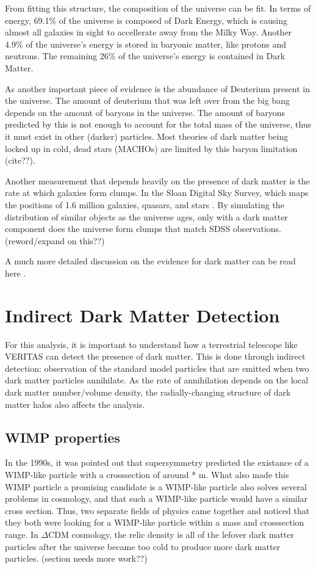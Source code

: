     From fitting this structure, the composition of the universe can be fit.
    In terms of energy, 69.1\% of the universe is composed of Dark Energy, which is causing almost all galaxies in sight to accellerate away from the Milky Way.
    Another 4.9\% of the universe's energy is stored in baryonic matter, like protons and neutrons.
    The remaining 26\% of the universe's energy is contained in Dark Matter\cite{planck2015}.

    As another important piece of evidence is the abundance of Deuterium present in the universe.
    The amount of deuterium that was left over from the big bang depends on the amount of baryons in the universe.
    The amount of baryons predicted by this is not enough to account for the total mass of the universe, thus it must exist in other (darker) particles.
    Most theories of dark matter being locked up in cold, dead stars (MACHOs) are limited by this baryon limitation (cite??).

    Another measurement that depends heavily on the presence of dark matter is the rate at which galaxies form clumps.
    In the Sloan Digital Sky Survey, which maps the positions of 1.6 million galaxies, quasars, and stars \cite{sdss_release}.
    By simulating the distribution of similar objects as the universe ages, only with a dark matter component does the universe form clumps that match SDSS observations.
    (reword/expand on this??)
  
    A much more detailed discussion on the evidence for dark matter can be read here \cite{DMPrimer}.

\section{Indirect Dark Matter Detection}
  For this analysis, it is important to understand how a terrestrial telescope like VERITAS can detect the presence of dark matter.
  This is done through indirect detection: observation of the standard model particles that are emitted when two dark matter particles annihilate.
  As the rate of annihilation depends on the local dark matter number/volume density, the radially-changing structure of dark matter halos also affects the analysis.
  \subsection{WIMP properties}

    In the 1990s, it was pointed out that supersymmetry predicted the existance of a WIMP-like particle with a crosssection of around  *  m.
    What also made this WIMP particle a promising candidate is a WIMP-like particle also solves several problems in cosmology, and that such a WIMP-like particle would have a similar cross section.
    Thus, two separate fields of physics came together and noticed that they both were looking for a WIMP-like particle within a mass and crosssection range.
    In $\Delta$CDM cosmology, the relic density is all of the lefover dark matter particles after the universe became too cold to produce more dark matter particles.
    (section needs more work??)

